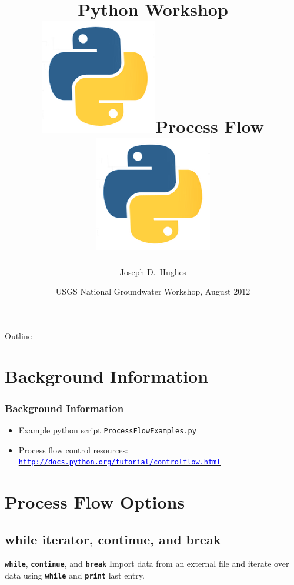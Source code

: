 \documentclass[t]{beamer}
\title[]{Python Workshop\\
 \includegraphics[scale=0.055]{figures/python-app.png}\hspace{5 pt}Process Flow\hspace{5 pt}\includegraphics[scale=0.055]{figures/python-app.png}}
\author[Hughes] %
{Joseph D.~Hughes}
\institute[USGS] %
{
  U.S. Geological Survey\\
  Florida Water Science Center, Tampa, Florida USA
  }
\date[UQ12] %
{USGS National Groundwater Workshop, August 2012}
\begin{document}
\begin{frame}
  \titlepage
\end{frame}

\begin{frame}{Outline}
\tableofcontents
\end{frame}

\section{Background Information}
\begin{frame}[fragile]
\frametitle{Background Information}
\begin{itemize}
\item Example python script \texttt{ProcessFlowExamples.py}

\item Process flow control resources: \\
\href{http://docs.python.org/tutorial/controlflow.html}{\texttt{\small{\textcolor{blue}{http://docs.python.org/tutorial/controlflow.html}}}}
\end{itemize}
\end{frame}

\section{Process Flow Options}
\subsection{while iterator, continue, and break}
\begin{frame}{\texttt{\textbf{while}}, \texttt{\textbf{continue}}, and \texttt{\textbf{break}}}
\small{Import data from an external file and iterate over data using \texttt{\textbf{while}} and \texttt{\textbf{print}} last entry.}
  \begin{figure}[ht]
  \centering
        \lstset{numbers=left}
        
   \end{figure}
\end{frame}
\end{document}
